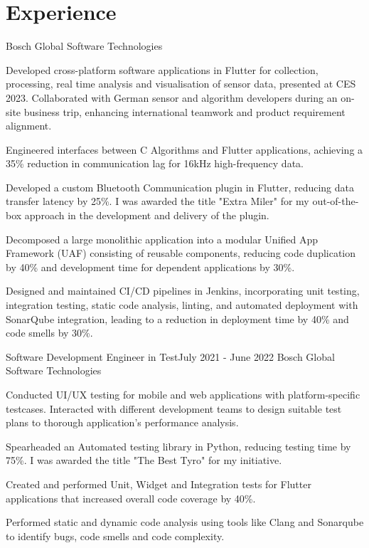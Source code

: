 \vspace{-5pt}
\section{Experience}
\resumeSubHeadingListStart
    {Bosch Global Software Technologies}{}
    \resumeItemListStart
          {
\item Developed cross-platform software applications in Flutter for collection, processing, real time analysis and visualisation of sensor data, presented at CES 2023. Collaborated with German sensor and algorithm developers during an on-site business trip, enhancing international teamwork and product requirement alignment.
  \item Engineered interfaces between C Algorithms and Flutter applications, achieving a 35\% reduction in communication lag for 16kHz high-frequency data.
  \item Developed a custom Bluetooth Communication plugin in Flutter, reducing data transfer latency by 25\%. I was awarded the title "Extra Miler" for my out-of-the-box approach in the development and delivery of the plugin.
  \item  Decomposed a large monolithic application into a modular Unified App Framework (UAF) consisting of reusable components, reducing code duplication by 40\% and development time for dependent applications by 30\%. 
   \item Designed and maintained CI/CD pipelines in Jenkins, incorporating unit testing, integration testing, static code analysis, linting, and automated deployment with SonarQube integration, leading to a reduction in deployment time by 40\% and code smells by 30\%.

}      \resumeItemListEnd
\vspace{-1pt}

    \resumeSubheading
		{Software Development Engineer in Test}{July 2021 - June 2022}
		{Bosch Global Software Technologies}{}
		\resumeItemListStart
        \item Conducted UI/UX testing for mobile and web applications with platform-specific testcases. Interacted with different development teams to design suitable test plans to thorough application's performance analysis.
        \item Spearheaded an Automated testing library in Python, reducing testing time by 75\%. I was awarded the title "The Best Tyro" for my initiative.
        \item Created and performed Unit, Widget and Integration tests for Flutter applications that increased overall code coverage by 40\%.
        \item Performed static and dynamic code analysis using tools like Clang and Sonarqube to identify bugs, code smells and code complexity.
	\resumeItemListEnd
    \vspace{-1pt}


